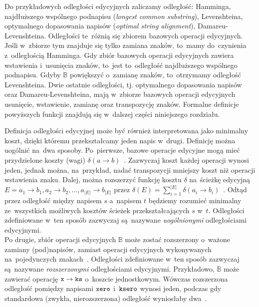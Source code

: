 \documentclass{praca1}
\begin{document}
Do przykładowych odległości edycyjnych zaliczamy odległość: Hamminga, najdłuższego wspólnego podnapisu (\emph{longest common substring}), Levenshteina, optymalnego dopasowania napisów (\emph{optimal string alignment}), Damareu-Levenshteina. Odległości te~różnią się zbiorem bazowych operacji edycyjnych. Jeśli w~zbiorze tym znajduje się tylko zamiana znaków, to~mamy do~czynienia z~odległością Hamminga. Gdy zbiór bazowych operacji edycyjnych zawiera wstawienia i~usunięcia znaków, to~jest to~odległość najdłuższego wspólnego podnapisu. Gdyby $\mathbb{B}$ powiększyć o~zamianę znaków, to~otrzymamy odległość Levenshteina. Dwie ostatnie odległości, tj. optymalnego dopasowania napisów oraz Damareu-Levenshteina, mają w~zbiorze bazowych operacji edycyjnych usunięcie, wstawienie, zamianę oraz transpozycję znaków. Formalne definicje powyższych funkcji znajdują się w~dalszej części niniejszego rozdziału.




Definicja odległości edycyjnej może być również interpretowana jako minimalny koszt, dzięki któremu przekształcamy jeden napis w~drugi. Definicję można uogólnić na~dwa sposoby. Po~pierwsze, bazowe operacje edycyjne mogą mieć przydzielone koszty (wagi) $\delta(a \rightarrow b)$~\cite{Wagner1974:stringtostring}. Zazwyczaj koszt każdej operacji wynosi jeden, jednak można, na~przykład, nadać transpozycji mniejszy koszt niż operacji wstawienia znaku. Dalej, można rozszerzyć funkcję kosztu $\delta$ na~ścieżkę edycyjną $E = a_1 \rightarrow b_1, a_2 \rightarrow b_2, \ldots, a_{|E|} \rightarrow b_{|E|}$ przez $\delta(E) = \sum\limits_{i=1}^{|E|}\delta(a_i \rightarrow b_i)$~\cite{Boytsov2011:indexingmethods}. Odtąd przez odległość między napisem $s$ a~napisem $t$ będziemy rozumieć minimalny ze~wszystkich możliwych kosztów ścieżek przekształcających $s$ w~$t$. Odległości zdefiniowane w~ten sposób zazwyczaj są~nazywane \emph{uogólnionymi} odległościami edycyjnymi.\\
Po drugie, zbiór operacji edycyjnych $\mathbb{B}$ może zostać rozszerzony o~ważone zamiany (pod)napisów, zamiast operacji edycyjnych wykonywanych na~pojedynczych znakach~\cite{Ukkonen1985:algorithmsforapprox}. Odległości zdefiniowane w~ten sposób zazwyczaj są~nazywane \emph{rozszerzonymi} odległościami edycyjnymi. Przykładowo, $\mathbb{B}$ może zawierać operację $\verb|x| \rightarrow \verb|ks|$ o~koszcie jednostkowym. Wówczas rozszerzona odległość pomiędzy napisami $\verb|xero|$ i~$\verb|ksero|$ wynosi jeden, podczas gdy standardowa (zwykła, nierozszerzona) odległość wyniosłaby dwa~\cite{Boytsov2011:indexingmethods}.
\end{document}
